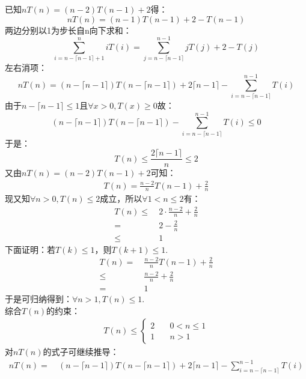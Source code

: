 \begin{solution}
    已知$nT(n)=(n-2)T(n-1)+2$得：
    $$nT(n)=(n-1)T(n-1)+2-T(n-1)$$
    两边分别以1为步长自n向下求和：
    \begin{displaymath}
        \sum_{i = n - \lceil n - 1 \rceil +1}^{n} iT(i) = 
        \sum_{j = n - \lceil n - 1 \rceil}^{n - 1} jT(j) + 2 - T(j) 
    \end{displaymath}
    左右消项：
    \begin{displaymath}
        nT(n) = (n - \lceil n - 1 \rceil)T(n - \lceil n - 1 \rceil) + 2 \lceil n - 1 \rceil - \sum_{i = n - \lceil n - 1 \rceil}^{n - 1} T(i)
    \end{displaymath}
    由于$n - \lceil n - 1 \rceil \le 1$且$\forall x>0, T(x) \ge 0$故：
    \begin{displaymath}
        (n - \lceil n - 1 \rceil)T(n - \lceil n - 1 \rceil) - \sum_{i = n - \lceil n - 1 \rceil}^{n - 1} T(i) \le 0
    \end{displaymath}   
    于是：
    $$T(n)\le \frac{2\lceil n - 1 \rceil}{n} \le 2$$
    又由$nT(n)=(n-2)T(n-1)+2$可知：
    \begin{align*}
        T(n)=\frac{n-2}{n}T(n-1)+\frac{2}{n}
    \end{align*}
    现又知$\forall n>0,T(n) \le 2$成立，所以$\forall 1 < n \le 2$有：
    \begin{align*}
        T(n) \le& ~2 \cdot\frac{n-2}{n}+ \frac{2}{n}\\
             =& ~2 - \frac{2}{n}\\
             \le& ~1
    \end{align*}
    下面证明：若$T(k)\le 1$，则$T(k+1) \le 1$.
    \begin{align*}
        T(n) =& ~\frac{n-2}{n}T(n-1)+\frac{2}{n}\\
        \le& ~\frac{n-2}{n}+\frac{2}{n}\\
        =& ~1
    \end{align*}
    于是可归纳得到：$\forall n>1,T(n)\le 1$.\\
    综合$T(n)$的约束：
    \begin{align*}
       T(n) \le \left\{
        \begin{aligned}
            2& \quad 0 < n \le 1 \\
            1& \quad n > 1
        \end{aligned}
       \right.
    \end{align*}
    对$nT(n)$的式子可继续推导：
    \begin{align*}
        nT(n) =&~ (n - \lceil n - 1 \rceil)T(n - \lceil n - 1 \rceil) + 2 \lceil n - 1 \rceil - \sum_{i = n - \lceil n - 1 \rceil}^{n - 1} T(i)\\

\end{align*}
\end{solution}
